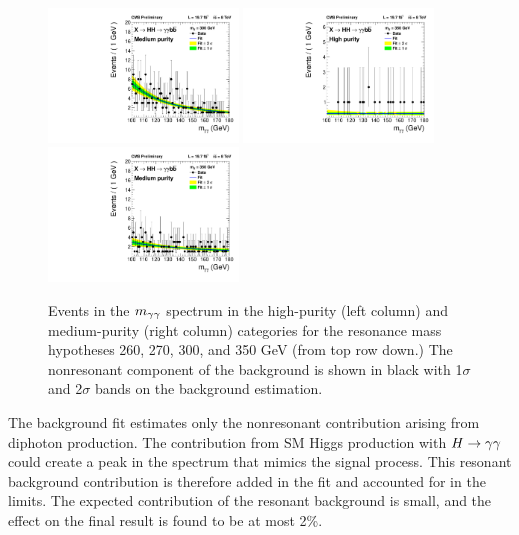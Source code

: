 \begin{figure}[ht]
\begin{center}
   \includegraphics[width=0.45\textwidth]{figures/results/databkgoversig_cat1_300GeV.pdf}
   \includegraphics[width=0.45\textwidth]{figures/results/databkgoversig_cat0_350GeV.pdf}
   \includegraphics[width=0.45\textwidth]{figures/results/databkgoversig_cat1_350GeV.pdf}
 \end{center}
\caption{Events in the $m_{\gamma\gamma}$ spectrum in the high-purity (left column) and medium-purity
(right column) categories for the resonance mass hypotheses 260, 270, 300, and 350 GeV
(from top row down.) The nonresonant component of the background is shown in black
with 1$\sigma$ and 2$\sigma$ bands on the background estimation.}
\label{fig:datafit_300}
\end{figure}

The background fit estimates only the nonresonant contribution arising from diphoton
production. The contribution from SM Higgs production with $H\to\gamma\gamma$ could create a peak in the
spectrum that mimics the signal process. This resonant background
contribution is therefore added in the fit and accounted for in the limits.
The expected contribution of the resonant background is small, and the
effect on the final result is found to be at most 2\%.


